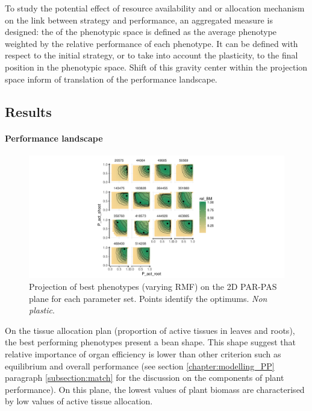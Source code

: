 To study the potential effect of resource availability and or allocation mechanism on the link between strategy and performance, an aggregated measure is designed: the  of the phenotypic space is defined as the average phenotype weighted by the relative performance of each phenotype. It can be defined with respect to the initial strategy, or to take into account the plasticity, to the final position in the phenotypic space. Shift of this gravity center within the projection space inform of translation of the performance landscape.

\subsection{Results}

\paragraph{Performance landscape}

\begin{figure}\label{fig:gravity_shift_resource}
\includegraphics[width = \textwidth]{./2_PP/Figures/Landscape/ld_performance_PAR-PAS.pdf}
\caption{Projection of best phenotypes (varying RMF) on the 2D PAR-PAS plane for each parameter set. Points identify the optimums. \textit{Non plastic}.}
\end{figure}

 On the tissue allocation plan (proportion of active tissues in leaves and roots), the best performing phenotypes present a bean shape. This shape suggest that relative importance of organ efficiency is lower than other criterion such as equilibrium and overall performance (see section \ref{chapter:modelling_PP} paragraph \ref{subsection:match} for the discussion on the components of plant performance). On this plane, the lowest values of plant biomass are characterised by low values of active tissue allocation. 
 
